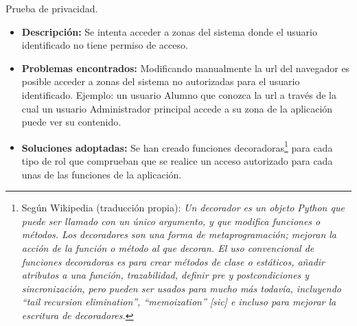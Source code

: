 \item Prueba de privacidad.
  \begin{itemize}
    \item \textbf{Descripción:} Se intenta acceder a zonas del sistema donde el
    usuario identificado no tiene permiso de acceso.
    \item \textbf{Problemas encontrados:} Modificando manualmente la url del
    navegador es posible acceder a zonas del sistema no autorizadas para el
    usuario identificado. Ejemplo: un usuario Alumno que conozca la url a través
    de la cual un usuario Administrador principal accede a su zona de la
    aplicación puede ver su contenido.
    \item \textbf{Soluciones adoptadas:} Se han creado funciones
    decoradoras\footnote{Según Wikipedia \cite{wikipedia1} (traducción propia):
    \textit{Un decorador es un objeto Python que puede ser llamado con un único
    argumento, y que modifica funciones o métodos. Los decoradores son una
    forma de metaprogramación; mejoran la acción de la función o método al que
    decoran. El uso convencional de funciones decoradoras es para crear métodos
    de clase o estáticos, añadir atributos a una función, trazabilidad, definir
    pre y postcondiciones y sincronización, pero pueden ser usados para mucho
    más todavía, incluyendo ``tail recursion elimination'', ``memoization''
    [sic] e incluso para mejorar la escritura de decoradores.}} para cada tipo
    de rol que comprueban que se realice un acceso autorizado para cada unas de
    las funciones de la aplicación.
  \end{itemize}
